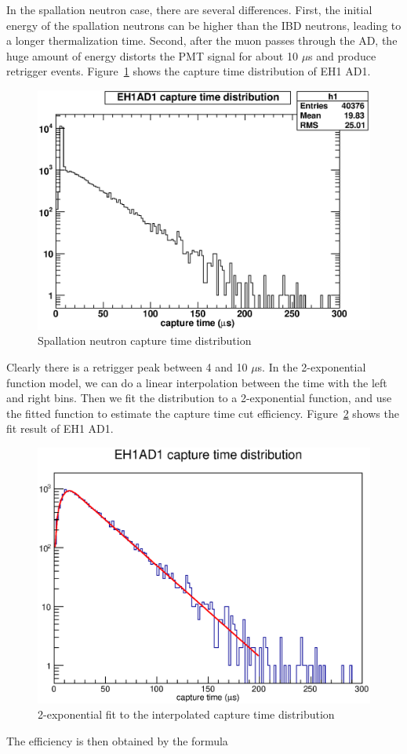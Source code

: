 In the spallation neutron case, there are several differences. First, the initial energy of the spallation neutrons can be higher than the IBD neutrons, leading to a longer thermalization time. Second, after the muon passes through the AD, the huge amount of energy distorts the PMT signal for about 10 $\mu$s and produce retrigger events. Figure~\ref{fig:spallation_capture_time} shows the capture time distribution of EH1 AD1.
\begin{figure}[ht]
	\centering
	\includegraphics[width=.6\textwidth]{figures/chap7/spallation_neutron_capture_time.eps}
	\caption{Spallation neutron capture time distribution}
	\label{fig:spallation_capture_time}
\end{figure}
Clearly there is a retrigger peak between 4 and 10 $\mu$s. In the 2-exponential function model, we can do a linear interpolation between the time with the left and right bins. Then we fit the distribution to a 2-exponential function, and use the fitted function to estimate the capture time cut efficiency. Figure~\ref{fig:fit_capture_time} shows the fit result of EH1 AD1.
\begin{figure}[ht]
	\centering
	\includegraphics[width=.6\textwidth]{figures/chap7/fit_capture_time.eps}
	\caption{2-exponential fit to the interpolated capture time distribution}
	\label{fig:fit_capture_time}
\end{figure}
The efficiency is then obtained by the formula
